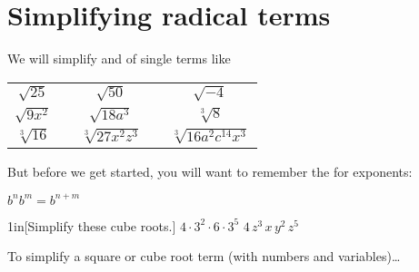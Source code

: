 \section*{Simplifying radical terms}

We will simplify  and  of single terms like
\begin{center}
    \large
    \renewcommand{\arraystretch}{1.75}
    \begin{tabular}{ccccc}
        $\sqrt{25}$ & \hspace{1in} & $\sqrt{50}$ & \hspace{1in} & $\sqrt{-4}$\\
        $\sqrt{9x^2}$ & \hspace{1in} & $\sqrt{18a^3}$ & \hspace{1in} & $\sqrt[3]{8}$\\
        $\sqrt[3]{16}$ & \hspace{1in} & $\sqrt[3]{27x^2z^3}$ & \hspace{1in} & $\sqrt[3]{16a^2c^{14}x^3}$\\
    \end{tabular}
\end{center}



But before we get started, you will want to remember the  for exponents:
\begin{myCenteredBox}[width=2in]
    \LARGE
    $ b^n b^m = b^{n+m} $
\end{myCenteredBox}

\begin{my2Problems}{1in}[Simplify these cube roots.]
    {
        $4 \cdot 3^2 \cdot 6 \cdot 3^5$ 
    }
    {
        $4 \, z^3 \, x \, y^2 \, z^5$ 
    }
\end{my2Problems}
\vfill
\begin{myConceptSteps}{
    To simplify a square or cube root term (with numbers and variables)\dots
}
\end{myConceptSteps}

